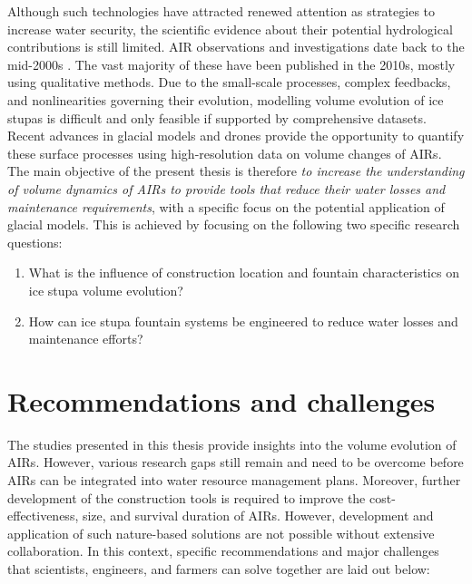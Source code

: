 Although such technologies have attracted renewed attention as strategies to increase water security, the scientific evidence about their potential hydrological contributions is still limited. \ac{AIR} observations and investigations
date back to the mid-2000s \citep{tveitenGlacierGrowingLocal2007}. The vast majority of these have been published in the
2010s, mostly using qualitative methods. Due to the small-scale processes, complex feedbacks, and nonlinearities
governing their evolution, modelling volume evolution of ice stupas is difficult and only feasible if supported
by comprehensive datasets. Recent advances in glacial models and drones provide the opportunity to quantify
these surface processes using high-resolution data on volume changes of \ac{AIRs}. The main objective of the present
thesis is therefore \textit{to increase the understanding of volume dynamics of \ac{AIRs} to provide tools
that reduce their water losses and maintenance requirements}, with a specific focus on the potential application
of glacial models. This is achieved by focusing on the following two specific research questions:

\begin{enumerate}
  \item{What is the influence of construction location and fountain characteristics on ice stupa volume
    evolution?}
  \item{How can ice stupa fountain systems be engineered to reduce water losses and maintenance efforts?}
\end{enumerate}


\section{Recommendations and challenges}

The studies presented in this thesis provide insights into the volume evolution of \ac{AIRs}. However, various research gaps still remain and need to be overcome before \ac{AIRs} can be integrated into water resource
management plans. Moreover, further development of the construction tools is required to improve the
cost-effectiveness, size, and survival duration of \ac{AIRs}. However, development and application of such
nature-based solutions are not possible without extensive collaboration. In this context,
specific recommendations and major challenges that scientists, engineers, and farmers can solve together are laid
out below:

